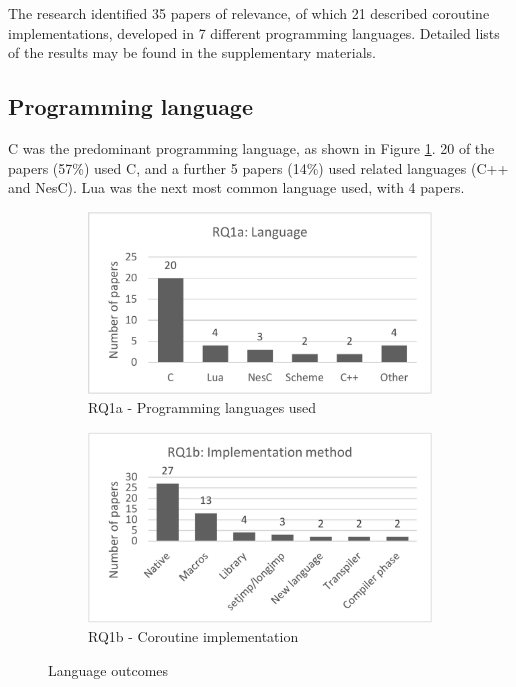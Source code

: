 \documentclass[format=acmsmall, review=false, screen=false]{acmart}
\begin{document}
The research identified 35 papers of relevance, of which 21 described coroutine implementations, developed in 7 different programming languages. Detailed lists of the results may be found in the supplementary materials.

\subsection{Programming language}

C was the predominant programming language, as shown in Figure \ref{fig:rq1a}. 20 of the papers (57\%) used C, and a further 5 papers (14\%) used related languages (C++ and NesC). Lua was the next most common language used, with 4 papers.

\begin{figure}[h]
	\centering
	\begin{subfigure}[h]{0.48\textwidth}
		\centering
		\includegraphics[width=\textwidth]{RQ1a-Programming-languages-used}
		\caption{RQ1a - Programming languages used}
		\label{fig:rq1a}
	\end{subfigure}
	\begin{subfigure}[h]{0.46\textwidth}
		\centering
		\includegraphics[width=\textwidth]{RQ1b-Coroutine-implementation}
		\caption{RQ1b - Coroutine implementation}
		\label{fig:rq1b}
	\end{subfigure}
	\caption{Language outcomes}
\end{figure}
\end{document}
